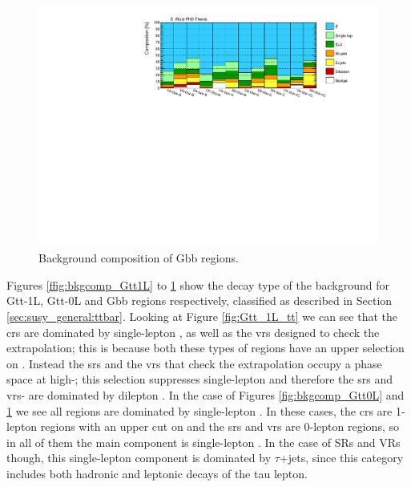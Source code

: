 \begin{figure}[h]
\includegraphics[width=\textwidth]{figures/strong_prod/comp_plots/Gbb_bkg.pdf}
\caption{Background composition of Gbb regions.}
	\label{fig:bkgcomp_Gbb}
\end{figure}


Figures \ref{ffig:bkgcomp_Gtt1L} to \ref{fig:bkgcomp_Gbb} show the decay type of the \ttbar background for  Gtt-1L, Gtt-0L and Gbb regions respectively, classified as described in Section \ref{sec:susy_general:ttbar}.
Looking at Figure \ref{fig:Gtt_1L_tt} we can see that the \glspl{cr} are dominated by single-lepton \ttbar, as well as the \glspl{vr} designed to check the \mtb extrapolation;
this is because both these types of regions have an upper selection on \mt.
Instead the \glspl{sr} and the \glspl{vr} that check the \mt extrapolation occupy a phase space at high-\mt;
this selection suppresses single-lepton \ttbar and therefore the \glspl{sr} and \glspl{vr}-\mt
are dominated by dilepton \ttbar.
In the case of Figures \ref{fig:bkgcomp_Gtt0L} and \ref{fig:bkgcomp_Gbb} we see all regions are dominated by single-lepton \ttbar.
In these cases, the \glspl{cr} are 1-lepton regions with an upper cut on \mt and the \glspl{sr} and \glspl{vr} are 0-lepton regions,
so in all of them the main component is  single-lepton \ttbar. In the case of SRs and VRs though, this single-lepton component
is dominated by $\tau$+jets, since this category includes both hadronic and leptonic decays of the tau lepton.


